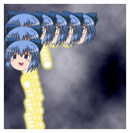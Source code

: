 		\begin{center}
			\includegraphics[width=0.50\textwidth]{./images/test3}
		\end{center}
		
		\newpage
